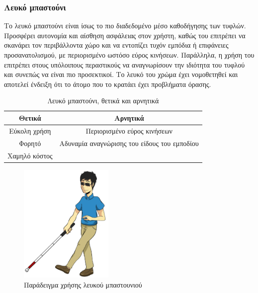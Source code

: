 \subsubsection{Λευκό μπαστούνι}
Το λευκό μπαστούνι είναι ίσως το πιο διαδεδομένο μέσο καθοδήγησης των τυφλών. Προσφέρει αυτονομία και αίσθηση ασφάλειας στον χρήστη, καθώς του επιτρέπει να σκανάρει τον περιβάλλοντα χώρο και να εντοπίζει τυχόν εμπόδια ή επιφάνειες προσανατολισμού, με περιορισμένο ωστόσο εύρος κινήσεων. Παράλληλα, η χρήση του επιτρέπει στους υπόλοιπους περαστικούς να αναγνωρίσουν την ιδιότητα του τυφλού και συνεπώς να είναι πιο προσεκτικοί. Το λευκό του χρώμα έχει νομοθετηθεί και αποτελεί ένδειξη ότι το άτομο που το κρατάει έχει προβλήματα όρασης.
\begin{table}[H]
    \centering
    \begin{tabular}{|c|c|}
        \hline
        Θετικά & Αρνητικά \\
        \hline
        \hline
        Εύκολη χρήση & Περιορισμένο εύρος κινήσεων \\
        Φορητό & Αδυναμία αναγνώρισης του είδους του εμποδίου\\
        Χαμηλό κόστος & \\ 
        \hline
    \end{tabular}
    \caption{Λευκό μπαστούνι, θετικά και αρνητικά}
    \label{tab:white-cane}
\end{table}

\begin{figure}[H]
    \centering
    \includegraphics[width=0.4\textwidth]{images/white_cane_use.png}
    \caption{Παράδειγμα χρήσης λευκού μπαστουνιού}
    \label{fig:white-cane-use}
\end{figure}

